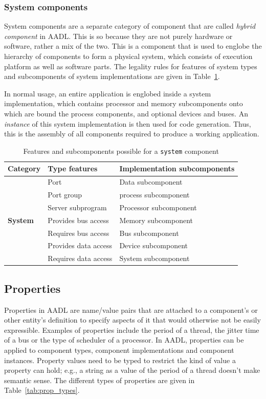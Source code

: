 \subsubsection{System components}
System components are a separate category of component that are called
\emph{hybrid component} in AADL. This is so because they are not
purely hardware or software, rather a mix of the two. This is a
component that is used to englobe the hierarchy of components to form
a physical system, which consists of execution platform as well as
software parts. The legality rules for features of system types and
subcomponents of system implementations are given in
Table~\ref{tab:sys_rules}.

In normal usage, an entire application is englobed inside a system
implementation, which contains processor and memory subcomponents onto
which are bound the process components, and optional devices and
buses. An \emph{instance} of this system implementation is then used
for code generation. Thus, this is the assembly of all components
required to produce a working application.

\begin{table}
\centering
\begin{tabular}{|l|l|l|}
\hline
\textbf{Category} & \textbf{Type features} & \textbf{Implementation
  subcomponents} \\
\hline
 & Port & Data subcomponent \\
 & Port group & process subcomponent \\
 & Server subprogram & Processor subcomponent \\
\textbf{System} & Provides bus access & Memory subcomponent \\
 & Requires bus access & Bus subcomponent \\
 & Provides data access & Device subcomponent \\
 & Requires data access & System subcomponent \\
\hline
\end{tabular}
\caption{Features and subcomponents possible for a \texttt{system}
  component}
\label{tab:sys_rules}
\end{table}

\subsection{Properties}
Properties in AADL are name/value pairs that are attached to a
component's or other entity's definition to specify aspects of it that
would otherwise not be easily expressible. Examples of properties
include the period of a thread, the jitter time of a bus or the type
of scheduler of a processor. In AADL, properties can be applied to
component types, component implementations and component instances.
Property values need to be typed to restrict the kind of value a
property can hold; e.g., a string as a value of the period of a thread
doesn't make semantic sense. The different types of properties are
given in Table~\ref{tab:prop_types}.

